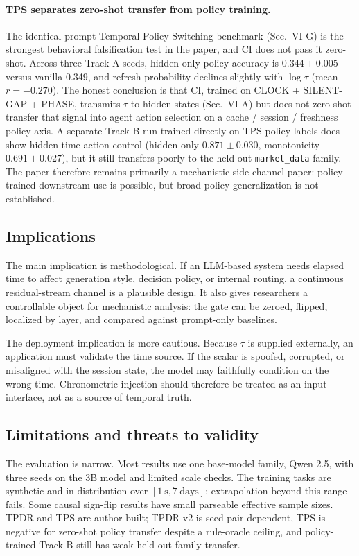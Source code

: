 \documentclass[conference,10pt]{IEEEtran}
\newcommand{\CI}{\textsc{CI}}
\newcommand{\Tau}{\tau}
\begin{document}
\paragraph{TPS separates zero-shot transfer from policy training.} The identical-prompt Temporal Policy Switching benchmark (Sec.~VI-G) is the strongest behavioral falsification test in the paper, and \CI{} does not pass it zero-shot. Across three Track A seeds, hidden-only policy accuracy is $0.344\pm0.005$ versus vanilla 0.349, and refresh probability declines slightly with $\log\Tau$ (mean $r=-0.270$). The honest conclusion is that \CI{}, trained on CLOCK + SILENT-GAP + PHASE, transmits $\Tau$ to hidden states (Sec.~VI-A) but does not zero-shot transfer that signal into agent action selection on a cache / session / freshness policy axis. A separate Track B run trained directly on TPS policy labels does show hidden-time action control (hidden-only $0.871\pm0.030$, monotonicity $0.691\pm0.027$), but it still transfers poorly to the held-out \texttt{market\_data} family. The paper therefore remains primarily a mechanistic side-channel paper: policy-trained downstream use is possible, but broad policy generalization is not established.

\subsection{Implications}

The main implication is methodological. If an LLM-based system needs elapsed time to affect generation style, decision policy, or internal routing, a continuous residual-stream channel is a plausible design. It also gives researchers a controllable object for mechanistic analysis: the gate can be zeroed, flipped, localized by layer, and compared against prompt-only baselines.

The deployment implication is more cautious. Because $\Tau$ is supplied externally, an application must validate the time source. If the scalar is spoofed, corrupted, or misaligned with the session state, the model may faithfully condition on the wrong time. Chronometric injection should therefore be treated as an input interface, not as a source of temporal truth.

\subsection{Limitations and threats to validity}

The evaluation is narrow. Most results use one base-model family, Qwen 2.5, with three seeds on the 3B model and limited scale checks. The training tasks are synthetic and in-distribution over $[1\ \mathrm{s},7\ \mathrm{days}]$; extrapolation beyond this range fails. Some causal sign-flip results have small parseable effective sample sizes. TPDR and TPS are author-built; TPDR v2 is seed-pair dependent, TPS is negative for zero-shot policy transfer despite a rule-oracle ceiling, and policy-trained Track B still has weak held-out-family transfer.
\end{document}

